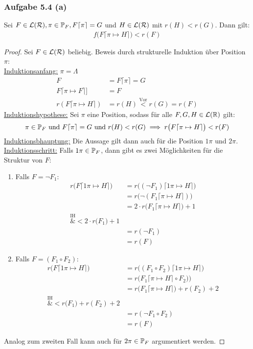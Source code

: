 \subsubsection{Aufgabe 5.4 (a)}
Sei $F\in\L(\RR),\pi\in\P_F,F\lceil\pi\rceil=G$ und $H\in\L(\RR)$ mit $r(H)<r(G)$. 
Dann gilt:
\begin{align*}
	f\big(F\lceil\pi\mapsto H\rceil\big)<r(F)
\end{align*}

\begin{proof}
	Sei $F\in\L(\RR)$ beliebig.
	Beweis durch strukturelle Induktion über Position $\pi$:\\
	\ul{Induktionsanfang:} $\pi=\Lambda$
	\begin{align*}
		F&=F\lceil\pi\rceil=G\\
		F\lceil\pi\mapsto F\rceil]&=F\\
		r(F\lceil\pi\mapsto H\rceil)&=r(H)\stackrel{\text{Vor}}{<}r(G)=r(F)
	\end{align*}
	\ul{Induktionshypothese:} Sei $\pi$ eine Position, sodass für alle $F,G,H\in\L(\R)$ gilt:
	\begin{align*}
		\pi\in\P_F\text{ und }F\lceil\pi\rceil=G\text{ und } r(H)<r(G)\implies r\big(F\lceil\pi\mapsto H\rceil\big)<r(F)
	\end{align*}
	\ul{Induktionsbhauptung:} Die Aussage gilt dann auch für die Position $1\pi$ und $2\pi$.\nl
	\ul{Induktionsschritt:} Falls $1\pi\in\P_F$, dann gibt es zwei Möglichkeiten für die Struktur von $F$:
	\begin{enumerate}
		\item Falls $F=\neg F_1$:
			\begin{align*}
				r\big(F\lceil1\pi\mapsto H\rceil\big)
				&=r\big((\neg F_1)\lceil1\pi\mapsto H\rceil\big)\\
				&=r\big(\neg(F_1\lceil\pi\mapsto H\rceil)\big)\\
				&=2\cdot r\big(F_1\lceil\pi\mapsto H\rceil\big)+1\\
				\overset{\text{IH}}&{<}
				2\cdot r\big(F_1\big)+1\\
				&=r(\neg F_1)\\
				&=r(F)
			\end{align*}
		\item Falls $F=(F_1\circ F_2)$:
			\begin{align*}
				r\big(F\lceil1\pi\mapsto H\rceil\big)
				&=r\big((F_1\circ F_2)\lceil1\pi\mapsto H\rceil\big)\\
				&=r\big(F_1\lceil\pi\mapsto H\rceil\circ F_2)\big)\\
				&=r\big(F_1\lceil\pi\mapsto H\rceil\big)+r(F_2)+2\\
				\overset{\text{IH}}&{<}
				r\big(F_1\big)+r(F_2)+2\\
				&=r(\neg F_1\circ F_2)\\
				&=r(F)
			\end{align*}
	\end{enumerate}
	Analog zum zweiten Fall kann auch für $2\pi\in\P_F$ argumentiert werden.
\end{proof}

